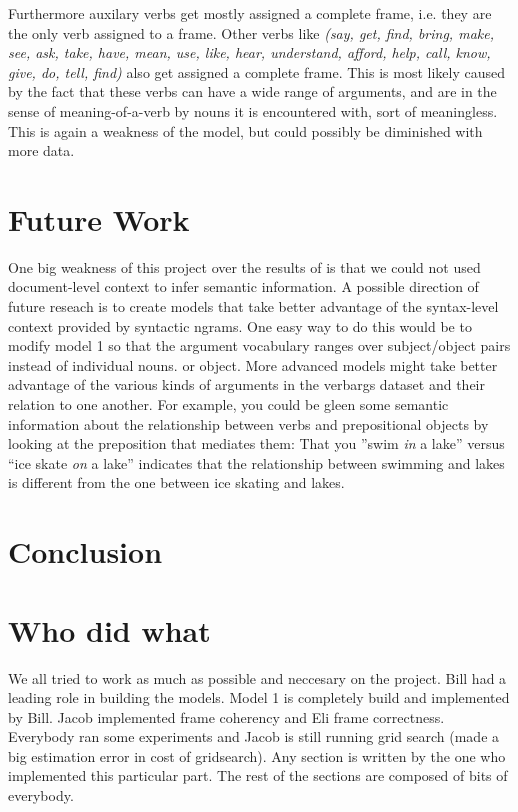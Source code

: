 \documentclass{article} %
\begin{document}
Furthermore auxilary verbs get mostly assigned a complete frame, i.e. they are the only verb assigned to a frame. Other verbs like \textit{(say, get, find, bring, make, see, ask, take, have, mean, use, like, hear, understand, afford, help, call, know, give, do, tell, find)} also get assigned a complete frame. This is most likely caused by the fact that these verbs can have a wide range of arguments, and are in the sense of meaning-of-a-verb by nouns it is encountered with, sort of meaningless. This is again a weakness of the model, but could possibly be diminished with more data.   

\section{Future Work}
One big weakness of this project over the results of \citet{oconnor2013} is that 
we could not used document-level context to infer semantic information.
A possible direction of future reseach is to create models that take better 
advantage of the syntax-level context provided by syntactic ngrams. 
One easy way to do this would be to modify model 1 so that the argument 
vocabulary ranges over subject/object pairs instead of individual nouns.
or object.
More advanced models might take better advantage of the various kinds of arguments
in the verbargs dataset and their relation to one another.
For example, you could be gleen some semantic information about the relationship between
verbs and prepositional objects by looking at the preposition that mediates them: 
That you ''swim \emph{in} a lake'' versus ``ice skate \emph{on} a lake'' 
indicates that the relationship between swimming and lakes is different from the one between
ice skating and lakes.

\section{Conclusion}


\section*{Who did what}
We all tried to work as much as possible and neccesary on the project. Bill had a leading role in building the models. Model 1 is completely build and implemented by Bill. Jacob implemented frame coherency and Eli frame correctness. Everybody ran some experiments and Jacob is still running grid search (made a big estimation error in cost of gridsearch). Any section is written by the one who implemented this particular part. The rest of the sections are composed of bits of everybody. 


\end{document}
